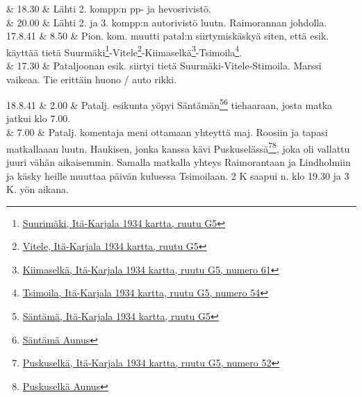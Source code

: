\documentclass[11pt,a5paper,oneside]{book}
\begin{document}
& 18.30 & Lähti 2. kompp:n pp- ja hevosrivistö. \\

& 20.00 & Lähti 2. ja 3. kompp:n autorivistö luutn. Raimorannan johdolla. \newline \\

17.8.41 & 8.50 & Pion. kom. muutti patal:n siirtymiskäskyä siten, että esik. käyttää tietä Suurmäki\footnote{\href{https://www.google.fi/maps/place/Bol'shiye+Gory,+Republic+of+Karelia,+Russia/}{Suurimäki, Itä-Karjala 1934 kartta, ruutu G5}}-Vitele\footnote{\href{https://www.google.fi/maps/place/Vidlitsa,+Republic+of+Karelia,+Russia,+186007/}{Vitele, Itä-Karjala 1934 kartta, ruutu G5}}-Kiimaselkä\footnote{\href{https://www.google.fi/maps/place/Kimusel'gskoye/@61.200226,32.7254117,16z/}{Kiimaselkä, Itä-Karjala 1934 kartta, ruutu G5, numero 61}}-Tsimoila\footnote{\href{https://www.google.fi/maps/place/61\%C2\%B013'40.5\%22N+32\%C2\%B044'50.1\%22E/@61.227911,32.7450663,906m/}{Tsimoila, Itä-Karjala 1934 kartta, ruutu G5, numero 54}}. \\

& 17.30 & Pataljoonan esik. siirtyi tietä Suurmäki-Vitele-Stimoila. Marssi vaikeaa. Tie erittäin huono / auto rikki. \\
\newpage

18.8.41 & 2.00 & Patalj. esikunta yöpyi Säntämän\footnote{\href{https://www.google.fi/maps/place/Syandeba,+Republic+of+Karelia,+Russia,+186006/}{Säntämä, Itä-Karjala 1934 kartta, ruutu G5}}\footnote{\href{https://www.sotahistoriallisetkohteet.fi/app/sights/view/-/id/1248/country/9/area/90/s_back/1}{Säntämä Aunus}} tiehaaraan, josta matka jatkui klo 7.00. \\ 

& 7.00 & Patalj. komentaja meni ottamaan yhteyttä maj. Roosiin ja tapasi matkallaaan luutn. Haukisen, jonka kanssa kävi Puskuselässä\footnote{\href{https://www.google.fi/maps/place/61\%C2\%B016'38.2\%22N+32\%C2\%B057'08.2\%22E/@61.277273,32.9500943,905m/}{Puskuselkä, Itä-Karjala 1934 kartta, ruutu G5, numero 52}}\footnote{\href{https://www.sotahistoriallisetkohteet.fi/app/sights/view/-/id/1242/country/9/area/90/s_back/1}{Puskuselkä Aunus}}, joka oli vallattu juuri vähän aikaisemmin. Samalla matkalla yhteys Raimorantaan ja Lindholmiin ja käsky heille muuttaa päivän kuluessa Tsimoilaan. 2 K saapui n. klo 19.30 ja 3 K. yön aikana. \newline\newline\newline \\
\end{document}
